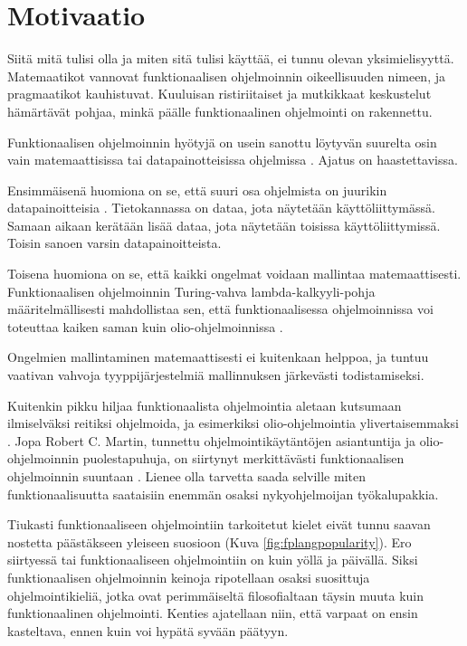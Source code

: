 
\chapter{Motivaatio}

Siitä mitä  tulisi olla ja miten sitä tulisi käyttää, ei tunnu olevan yksimielisyyttä. Matemaatikot vannovat funktionaalisen ohjelmoinnin oikeellisuuden nimeen, ja pragmaatikot kauhistuvat. Kuuluisan ristiriitaiset ja mutkikkaat keskustelut hämärtävät pohjaa, minkä päälle funktionaalinen ohjelmointi on rakennettu. \citep{stackoverflow_what_monad,stackoverflow:why_monad,promises-spec-94,dear_functional_bros}

Funktionaalisen ohjelmoinnin hyötyjä on usein sanottu löytyvän suurelta osin vain matemaattisissa tai datapainotteisissa ohjelmissa \cite[10]{cantarella_fp_haitat}. Ajatus on haastettavissa.

Ensimmäisenä huomiona on se, että suuri osa ohjelmista on juurikin datapainoitteisia \cite{gartnerb2b}. Tietokannassa on dataa, jota näytetään käyttöliittymässä. Samaan aikaan kerätään lisää dataa, jota näytetään toisissa käyttöliittymissä. Toisin sanoen varsin datapainoitteista.

Toisena huomiona on se, että kaikki ongelmat voidaan mallintaa matemaattisesti. Funktionaalisen ohjelmoinnin Turing-vahva lambda-kalkyyli-pohja määritelmällisesti mahdollistaa sen, että funktionaalisessa ohjelmoinnissa voi toteuttaa kaiken saman kuin olio-ohjelmoinnissa \cite{Tan2004,computerphile_lambda}.

Ongelmien mallintaminen matemaattisesti ei kuitenkaan helppoa, ja tuntuu vaativan vahvoja tyyppijärjestelmiä mallinnuksen järkevästi todistamiseksi.

Kuitenkin pikku hiljaa funktionaalista ohjelmointia aletaan kutsumaan ilmiselväksi reitiksi ohjelmoida, ja esimerkiksi olio-ohjelmointia ylivertaisemmaksi \cite[1]{the_oo_way}. Jopa Robert C. Martin, tunnettu ohjelmointikäytäntöjen asiantuntija ja olio-ohjelmoinnin puolestapuhuja, on siirtynyt merkittävästi funktionaalisen ohjelmoinnin suuntaan \cite{martin2019whyclojure,martin2017pragmaticfp}. Lienee olla tarvetta saada selville miten funktionaalisuutta saataisiin enemmän osaksi nykyohjelmoijan työkalupakkia.

Tiukasti funktionaaliseen ohjelmointiin tarkoitetut kielet eivät tunnu saavan nostetta päästäkseen yleiseen suosioon (Kuva \ref{fig:fplangpopularity}). Ero siirtyessä  tai  funktionaaliseen ohjelmointiin on kuin yöllä ja päivällä. Siksi funktionaalisen ohjelmoinnin keinoja ripotellaan osaksi suosittuja ohjelmointikieliä, jotka ovat perimmäiseltä filosofialtaan täysin muuta kuin funktionaalinen ohjelmointi. Kenties ajatellaan niin, että varpaat on ensin kasteltava, ennen kuin voi hypätä syvään päätyyn.

